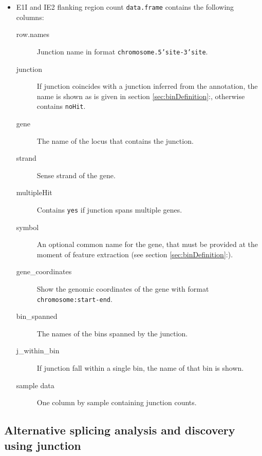 \documentclass{article}
\begin{document}
\begin{itemize}
  \item E1I and IE2 flanking region count \texttt{data.frame} contains the
  following columns:
    \begin{description}
      \item[row.names] Junction name in format \texttt{chromosome.5'site-3'site}.
      \item[junction] If junction coincides with a junction inferred
      from the annotation, the name is shown as is given in section
      \ref{sec:binDefinition}:, otherwise
      contains \texttt{noHit}.
      \item[gene] The name of the locus that contains the junction.
      \item[strand] Sense strand of the gene.
      \item[multipleHit] Contains \texttt{yes} if junction spans multiple
      genes.
      \item[symbol] An optional common name for the gene, that must be provided at
      the moment of feature extraction (see section \ref{sec:binDefinition}:).
      \item[gene\_coordinates] Show the genomic coordinates of the gene with
      format \texttt{chromosome:start-end}.
      \item[bin\_spanned] The names of the bins spanned by the junction.
      \item[j\_within\_bin] If junction fall within a single bin, the name of
      that bin is shown.
      \item[sample data] One column by sample containing junction counts.
      \\
    \end{description}
    
\end{itemize}

\subsection{Alternative splicing analysis and discovery using junction }
\end{document}
